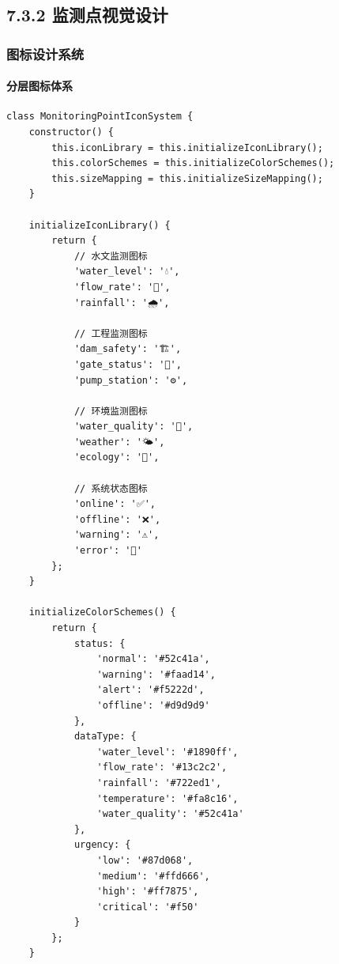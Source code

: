 \subsection{7.3.2
监测点视觉设计}\label{ux76d1ux6d4bux70b9ux89c6ux89c9ux8bbeux8ba1}

\subsubsection{图标设计系统}\label{ux56feux6807ux8bbeux8ba1ux7cfbux7edf}

\paragraph{分层图标体系}\label{ux5206ux5c42ux56feux6807ux4f53ux7cfb}

\begin{lstlisting}
class MonitoringPointIconSystem {
    constructor() {
        this.iconLibrary = this.initializeIconLibrary();
        this.colorSchemes = this.initializeColorSchemes();
        this.sizeMapping = this.initializeSizeMapping();
    }
    
    initializeIconLibrary() {
        return {
            // 水文监测图标
            'water_level': '💧',
            'flow_rate': '🌊',
            'rainfall': '🌧️',
            
            // 工程监测图标
            'dam_safety': '🏗️',
            'gate_status': '🚪',
            'pump_station': '⚙️',
            
            // 环境监测图标
            'water_quality': '🧪',
            'weather': '🌤️',
            'ecology': '🌱',
            
            // 系统状态图标
            'online': '✅',
            'offline': '❌',
            'warning': '⚠️',
            'error': '🚫'
        };
    }
    
    initializeColorSchemes() {
        return {
            status: {
                'normal': '#52c41a',
                'warning': '#faad14',
                'alert': '#f5222d',
                'offline': '#d9d9d9'
            },
            dataType: {
                'water_level': '#1890ff',
                'flow_rate': '#13c2c2',
                'rainfall': '#722ed1',
                'temperature': '#fa8c16',
                'water_quality': '#52c41a'
            },
            urgency: {
                'low': '#87d068',
                'medium': '#ffd666',
                'high': '#ff7875',
                'critical': '#f50'
            }
        };
    }
    

\end{lstlisting}
